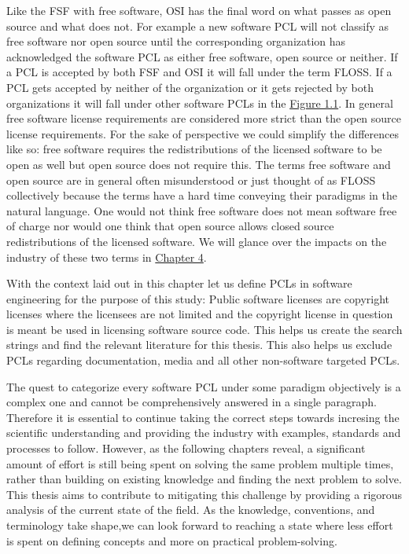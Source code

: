 Like the FSF with free software, OSI has the final word on what passes as open source and what does not. For example a new software PCL will not classify as free software nor open source until the corresponding organization has acknowledged the software PCL as either free software, open source or neither. If a PCL is accepted by both FSF and OSI it will fall under the term FLOSS. If a PCL gets accepted by neither of the organization or it gets rejected by both organizations it will fall under other software PCLs in the \hyperref[fig:terms]{Figure 1.1}. In general free software license requirements are considered more strict than the open source license requirements. For the sake of perspective we could simplify the differences like so: free software requires the redistributions of the licensed software to be open as well but open source does not require this. The terms free software and open source are in general often misunderstood or just thought of as FLOSS collectively because the terms have a hard time conveying their paradigms in the natural language. One would not think free software does not mean software free of charge nor would one think that open source allows closed source redistributions of the licensed software. We will glance over the impacts on the industry of these two terms in \hyperref[discussion]{Chapter 4}.

With the context laid out in this chapter let us define PCLs in software engineering for the purpose of this study: Public software licenses are copyright licenses where the licensees are not limited and the copyright license in question is meant be used in licensing software source code. This helps us create the search strings and find the relevant literature for this thesis. This also helps us exclude PCLs regarding documentation, media and all other non-software targeted PCLs.

The quest to categorize every software PCL under some paradigm objectively is a complex one and cannot be comprehensively answered in a single paragraph. Therefore it is essential to continue taking the correct steps towards incresing the scientific understanding and providing the industry with examples, standards and processes to follow. However, as the following chapters reveal, a significant amount of effort is still being spent on solving the same problem multiple times, rather than building on existing knowledge and finding the next problem to solve. This thesis aims to contribute to mitigating this challenge by providing a rigorous analysis of the current state of the field. As the knowledge, conventions, and terminology take shape,we can look forward to reaching a state where less effort is spent on defining concepts and more on practical problem-solving.
